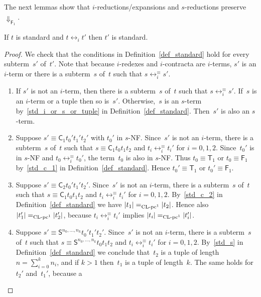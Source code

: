 \documentclass[a4paper,UKenglish]{lipics-v2016}
\newcommand{\Cs}{\mathsf{C}}
\newcommand{\Fs}{\mathsf{F}}
\newcommand{\Ts}{\mathsf{T}}
\newcommand{\Ss}{\mathsf{S}}
\newcommand{\Da}{\ensuremath{\Downarrow}}
\newcommand{\eqv}{\ensuremath{\leftrightarrow}}
\newcommand{\erase}[1]{\ensuremath{|#1|}}
\newcommand{\sCLC}{{\ensuremath{\text{\rm CL-pc}^1}}}
\begin{document}
The next lemmas show that $i$-reductions/expansions and
$s$-reductions preserve~$\Da_{\Fs_1}$.

\begin{lemma}\label{lem_eqv_i_std}
  If $t$ is standard and $t \eqv_{i} t'$ then $t'$ is standard.
\end{lemma}

\begin{proof}
  We check that the conditions in Definition~\ref{def_standard} hold
  for every subterm~$s'$ of~$t'$. Note that because $i$-redexes and
  $i$-contracta are $i$-terms, $s'$ is an $i$-term or there is a
  subterm~$s$ of~$t$ such that $s \eqv_{i}^{\equiv} s'$.
  \begin{enumerate}
  \item If $s'$ is not an $i$-term, then there is a subterm~$s$ of~$t$
    such that $s \eqv_{i}^{\equiv} s'$. If~$s$ is an $i$-term or a
    tuple then so is~$s'$. Otherwise,~$s$ is an $s$-term
    by~\ref{std_i_or_s_or_tuple} in
    Definition~\ref{def_standard}. Then~$s'$ is also an $s$-term.
  \item Suppose $s' \equiv \Cs_1 t_0' t_1' t_2'$ with $t_0'$ in
    $s$-NF. Since~$s'$ is not an $i$-term, there is a subterm~$s$
    of~$t$ such that $s \equiv \Cs_1 t_0 t_1 t_2$ and
    $t_i \eqv_{i}^{\equiv} t_i'$ for $i=0,1,2$. Since~$t_0'$ is in
    $s$-NF and $t_0 \eqv_{i}^{\equiv} t_0'$, the term~$t_0$ is also in
    $s$-NF. Thus $t_0 \equiv \Ts_1$ or $t_0 \equiv \Fs_1$
    by~\ref{std_c_1} in Definition~\ref{def_standard}. Hence
    $t_0' \equiv \Ts_1$ or $t_0' \equiv \Fs_1$.
  \item Suppose $s' \equiv \Cs_2 t_0' t_1' t_2'$. Since~$s'$ is not an
    $i$-term, there is a subterm~$s$ of~$t$ such that
    $s \equiv \Cs_1 t_0 t_1 t_2$ and $t_i \eqv_{i}^{\equiv} t_i'$ for
    $i=0,1,2$. By~\ref{std_c_2} in Definition~\ref{def_standard} we
    have $\erase{t_1} =_\sCLC \erase{t_2}$. Hence also
    $\erase{t_1'} =_\sCLC \erase{t_2'}$, because
    $t_i \eqv_{i}^{\equiv} t_i'$ implies
    $\erase{t_i} =_\sCLC \erase{t_i'}$.
  \item Suppose $s' \equiv \Ss^{n_0,\ldots,n_k} t_0' t_1'
    t_2'$. Since~$s'$ is not an $i$-term, there is a subterm~$s$
    of~$t$ such that $s \equiv \Ss^{n_0,\ldots,n_k} t_0 t_1 t_2$ and
    $t_i \eqv_{i}^{\equiv} t_i'$ for $i=0,1,2$. By~\ref{std_s} in
    Definition~\ref{def_standard} we conclude that~$t_2$ is a tuple of
    length $n=\sum_{i=0}^kn_i$, and if $k > 1$ then~$t_1$ is a tuple
    of length~$k$. The same holds for~$t_2'$ and~$t_1'$, because a

\end{enumerate}
\end{proof}
\end{document}
